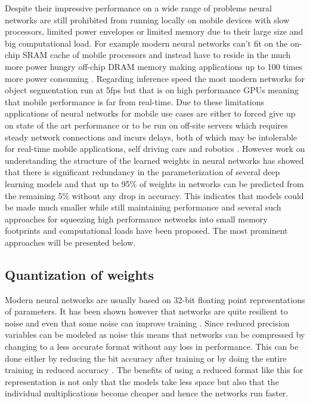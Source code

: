 \documentclass{kththesis}
\newcommand{\bibentry}[1]{\parencite{#1}}
\begin{document}
Despite their impressive performance on a wide range of problems neural networks
are still prohibited from running locally on mobile devices with slow
processors, limited power envelopes or limited memory due to their large size
and big computational load. For example modern neural networks can't fit on the
on-chip SRAM cache of mobile processors and instead have to reside in the much more power hungry
off-chip DRAM memory making applications up to 100 times more power consuming
\bibentry{han2015learning}. Regarding inference speed the most modern networks
for object segmentation \bibentry{he2017mask} run at 5fps but that is on high
performance GPUs meaning that mobile performance is far from real-time. Due to
these limitations applications of neural networks for mobile use cases are
either to forced give up on state of the art performance or to be run on
off-site servers which requires steady network connections and incurs delays,
both of which may be intolerable for real-time mobile applications, self driving
cars and robotics \bibentry{jin2014flattened}. However work on understanding the
structure of the learned weights in neural networks
\bibentry{denil2013predicting} has showed that there is significant redundancy
in the parameterization of several deep learning models and that up to 95\% of
weights in networks can be predicted from the remaining 5\% without any drop in
accuracy. This indicates that models could be made much smaller while still
maintaining performance and several such approaches for squeezing high
performance networks into small memory footprints and computational loads have
been proposed. The most prominent approaches will be presented below.  

\subsection{Quantization of weights}
Modern neural networks are usually based on 32-bit floating point
representations of parameters. It has been shown however that networks are quite
resilient to noise and even that some noise can improve training
\bibentry{murray1994enhanced}. Since reduced precision variables can be modeled
as noise this means that networks can be compressed by changing to a less
accurate format without any loss in performance. This can be done either by
reducing the bit accuracy after training \bibentry{vanhoucke2011improving}  or
by doing the entire training in reduced accuracy \bibentry{hubara2016quantized}
\bibentry{gupta2015deep}. The benefits of using a reduced format like this for
representation is not only that the models take less space but also that the
individual multiplications become cheaper and hence the networks run faster. 
\end{document}
